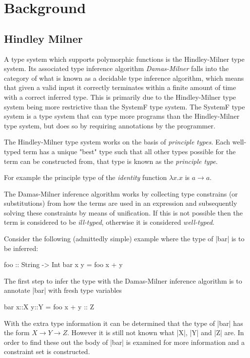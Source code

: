 \chapter{Background}
\section{Hindley Milner}
A type system which supports polymorphic functions is the Hindley-Milner\cite{HM} type system. Its associated type inference algorithm \emph{Damas-Milner} falls into the category of what is known as a decidable type inference algorithm, which means that given a valid input it correctly terminates within a finite amount of time with a correct inferred type. This is primarily due to the Hindley-Milner type system being more restrictive than the SystemF type system. The SystemF type system is a type system that can type more programs than the Hindley-Milner type system, but does so by requiring annotations by the programmer.

The Hindley-Milner type system works on the basis of \textit{principle types}. Each well-typed term has a unique "best" type such that all other types possible for the term can be constructed from, that type is known as the \textit{principle type}. 

For example the principle type of the \textit{identity} function $\lambda x.x$  is $a \rightarrow a$.

The Damas-Milner inference algorithm works by collecting type constrains (or substitutions) from how the terms are used in an expression and subsequently solving these constraints by means of unification. If this is not possible then the term is considered to be \textit{ill-typed}, otherwise it is considered \textit{well-typed}.

Consider the following (admittedly simple) example where the type of |bar| is to be inferred:
\begin{code}
foo :: String -> Int
bar x y = foo x + y
\end{code}

The first step to infer the type with the Damas-Milner inference algorithm is to annotate |bar| with fresh type variables 
\begin{code}
bar x::X y::Y = foo x + y :: Z
\end{code}

With the extra type information it can be determined that the type of |bar| has the form $X \rightarrow Y \rightarrow Z$. However it is still not known what |X|, |Y| and |Z| are. In order to find these out the body of |bar| is examined for more information and a constraint set is constructed.

